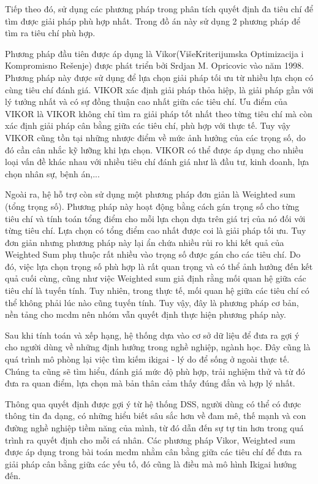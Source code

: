     Tiếp theo đó, sử dụng các phương pháp trong phân tích quyết định đa tiêu chí để tìm được giải pháp phù hợp nhất. Trong đồ án này sử dụng 2 phương pháp để tìm ra tiêu chí phù hợp.
    
    Phương pháp đầu tiên được áp dụng là Vikor(VišeKriterijumska Optimizacija i Kompromisno Rešenje) được phát triển bởi Srdjan M. Opricovic vào năm 1998. Phương pháp này được sử dụng để lựa chọn giải pháp tối ưu từ nhiều lựa chọn có cùng tiêu chí đánh giá. VIKOR xác định giải pháp thỏa hiệp, là giải pháp gần với lý tưởng nhất và có sự đồng thuận cao nhất giữa các tiêu chí. Ưu điểm của VIKOR là VIKOR không chỉ tìm ra giải pháp tốt nhất theo từng tiêu chí mà còn xác định giải pháp cân bằng giữa các tiêu chí, phù hợp với thực tế. Tuy vậy VIKOR cũng tồn tại những nhược điểm về mức ảnh hưởng của các trọng số, do đó cần cân nhắc kỹ lưỡng khi lựa chọn. VIKOR có thể được áp dụng cho nhiều loại vấn đề khác nhau với nhiều tiêu chí đánh giá như là đầu tư, kinh doanh, lựa chọn nhân sự, bệnh án,...

    Ngoài ra, hệ hỗ trợ còn sử dụng một phương pháp đơn giản là Weighted sum (tổng trọng số). Phương pháp này hoạt động bằng cách gán trọng số cho từng tiêu chí và tính toán tổng điểm cho mỗi lựa chọn dựa trên giá trị của nó đối với từng tiêu chí. Lựa chọn có tổng điểm cao nhất được coi là giải pháp tối ưu. Tuy đơn giản nhưng phương pháp này lại ẩn chứa nhiều rủi ro khi kết quả của Weighted Sum phụ thuộc rất nhiều vào trọng số được gán cho các tiêu chí. Do đó, việc lựa chọn trọng số phù hợp là rất quan trọng và có thể ảnh hưởng đến kết quả cuối cùng, cũng như việc Weighted sum giả định rằng mối quan hệ giữa các tiêu chí là tuyến tính. Tuy nhiên, trong thực tế, mối quan hệ giữa các tiêu chí có thể không phải lúc nào cũng tuyến tính. Tuy vậy, đây là phương pháp cơ bản, nền tảng cho \acrshort{mcdm} nên nhóm vẫn quyết định thực hiện phương pháp này.
    
    Sau khi tính toán và xếp hạng, hệ thống dựa vào cơ sở dữ liệu để đưa ra gợi ý cho người dùng về những định hướng trong nghề nghiệp, ngành học. Đây cũng là quá trình mô phòng lại việc tìm kiếm ikigai - lý do để sống ở ngoài thực tế. Chúng ta cũng sẽ tìm hiểu, đánh giá mức độ phù hợp, trải nghiệm thử và từ đó đưa ra quan điểm, lựa chọn mà bản thân cảm thấy đúng đắn và hợp lý nhất.
    
    Thông qua quyết định được gợi ý từ hệ thống DSS, người dùng có thể có được thông tin đa dạng, có những hiểu biết sâu sắc hơn về đam mê, thế mạnh và con đường nghề nghiệp tiềm năng của mình, từ đó dẫn đến sự tự tin hơn trong quá trình ra quyết định cho mỗi cá nhân. Các phương pháp Vikor, Weighted sum được áp dụng trong bài toán \acrshort{mcdm} nhằm cân bằng giữa các tiêu chí để đưa ra giải pháp cân bằng giữa các yếu tố, đó cũng là điều mà mô hình Ikigai hướng đến.